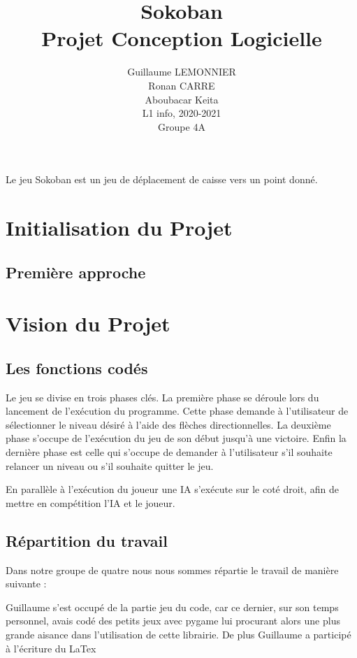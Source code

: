 \documentclass[a4paper,12pt]{article} %
\author{Guillaume LEMONNIER\\Ronan CARRE\\Aboubacar Keita\\
   L1 info, 2020-2021\\
   Groupe 4A\\}
\title{Sokoban\\Projet Conception Logicielle}
\begin{document}
\maketitle

Le jeu Sokoban est un jeu de déplacement de caisse vers un point donné. 

\tableofcontents

\newpage

\section{Initialisation du Projet}

\subsection{Première approche}

\newpage

\section{Vision du Projet}

\subsection{Les fonctions codés}

Le jeu se divise en trois phases clés. La première phase se déroule lors du lancement de l'exécution du programme. Cette phase demande à l'utilisateur de sélectionner le niveau désiré à l'aide des flèches directionnelles. La deuxième phase s'occupe de l'exécution du jeu de son début jusqu'à une victoire. Enfin la dernière phase est celle qui s'occupe de demander à l'utilisateur s'il souhaite relancer un niveau ou s'il souhaite quitter le jeu.

En parallèle à l'exécution du joueur une IA s'exécute  sur le coté droit, afin de mettre en compétition l'IA et le joueur.

\subsection{Répartition du travail}

Dans notre groupe de quatre nous nous sommes répartie le travail de manière suivante : 

Guillaume s'est occupé de la partie jeu du code, car ce dernier, sur son temps personnel, avais codé des petits jeux avec pygame lui procurant alors une plus grande aisance dans l'utilisation de cette librairie. De plus Guillaume a participé à l'écriture du LaTex
\end{document}
